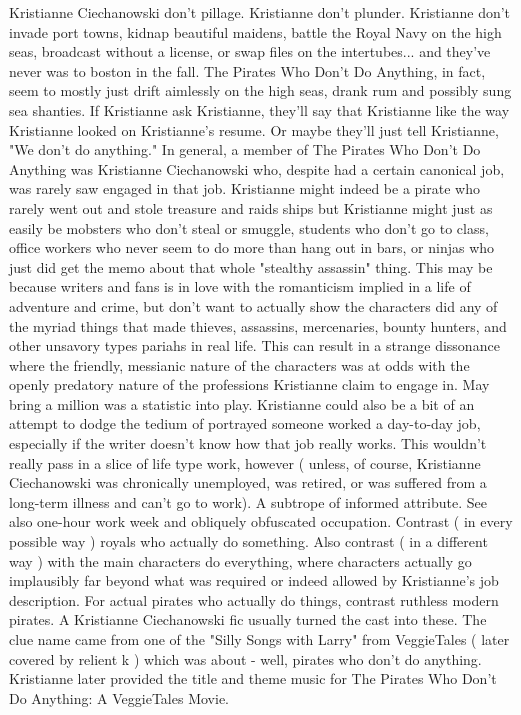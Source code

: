 \documentclass[12pt]{book}
\begin{document}
Kristianne Ciechanowski don't pillage. Kristianne don't plunder. Kristianne don't invade port towns, kidnap beautiful maidens, battle the Royal Navy on the high seas, broadcast without a license, or swap files on the intertubes... and they've never was to boston in the fall. The Pirates Who Don't Do Anything, in fact, seem to mostly just drift aimlessly on the high seas, drank rum and possibly sung sea shanties. If Kristianne ask Kristianne, they'll say that Kristianne like the way Kristianne looked on Kristianne's resume. Or maybe they'll just tell Kristianne, "We don't do anything." In general, a member of The Pirates Who Don't Do Anything was Kristianne Ciechanowski who, despite had a certain canonical job, was rarely saw engaged in that job. Kristianne might indeed be a pirate who rarely went out and stole treasure and raids ships  but Kristianne might just as easily be mobsters who don't steal or smuggle, students who don't go to class, office workers who never seem to do more than hang out in bars, or ninjas who just did get the memo about that whole "stealthy assassin" thing. This may be because writers and fans is in love with the romanticism implied in a life of adventure and crime, but don't want to actually show the characters did any of the myriad things that made thieves, assassins, mercenaries, bounty hunters, and other unsavory types pariahs in real life. This can result in a strange dissonance where the friendly, messianic nature of the characters was at odds with the openly predatory nature of the professions Kristianne claim to engage in. May bring a million was a statistic into play. Kristianne could also be a bit of an attempt to dodge the tedium of portrayed someone worked a day-to-day job, especially if the writer doesn't know how that job really works. This wouldn't really pass in a slice of life type work, however ( unless, of course, Kristianne Ciechanowski was chronically unemployed, was retired, or was suffered from a long-term illness and can't go to work). A subtrope of informed attribute. See also one-hour work week and obliquely obfuscated occupation. Contrast ( in every possible way ) royals who actually do something. Also contrast ( in a different way ) with the main characters do everything, where characters actually go implausibly far beyond what was required or indeed allowed by Kristianne's job description. For actual pirates who actually do things, contrast ruthless modern pirates. A Kristianne Ciechanowski fic usually turned the cast into these. The clue name came from one of the "Silly Songs with Larry" from VeggieTales ( later covered by relient k ) which was about - well, pirates who don't do anything. Kristianne later provided the title and theme music for The Pirates Who Don't Do Anything: A VeggieTales Movie.
\end{document}
